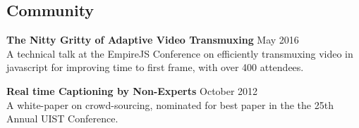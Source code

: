 \documentclass[oneside, final]{scrartcl}
\begin{document}
\begin{center}
\begin{comment}
    \textsc{Research Fellowship with Xerox\hfill Rochester, NY\\}
    \textsc{University of Rochester HCI Lab \hfill June 2011 - May 2012\\}
    \textsc{Research Fellowship with Xerox\hfill Rochester, NY\\}
    \begin{itemize}
      \setlength{\itemsep}{1pt}
      \setlength{\parskip}{0pt}
      \setlength{\parsep}{0pt}
      \setlength{\leftmargin}{-5mm}
          \item Researched crowd-sourced real-time audio transcription for hearing-impaired internet users.
          \item Developed a management applicaton for Amazon Mechanical Turk which allowed faster iteration on experiments.
          \item Awarded Xerox Fellowship for contributions to real-time processing of crowd inputs.
          \item Participated in project planning, design, and development of services for gathering and retaining Amazon Mechanical Turk workers.
    \end{itemize}
\end{comment}


\section{Community}
\begin{flushleft}

    \textbf{The Nitty Gritty of Adaptive Video Transmuxing} \hfill May  2016\\
    A technical talk at the EmpireJS Conference on efficiently transmuxing video in javascript for improving time to first frame, with over 400 attendees.

    \vspace{10pt}

    \textbf{Real time Captioning by Non-Experts} \hfill October  2012\\
    A white-paper on crowd-sourcing, nominated for best paper in the the 25th Annual UIST Conference.




\end{flushleft}
\end{center}
\end{document}
